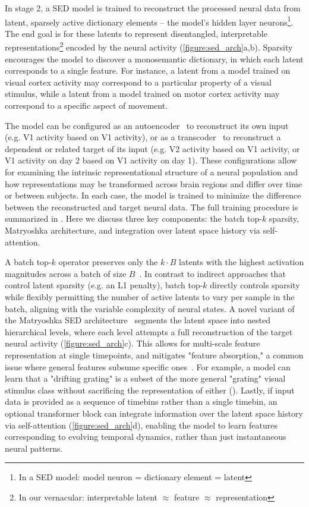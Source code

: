 In stage 2, a SED model is trained to reconstruct the processed neural data from latent, sparsely active dictionary elements -- the model's hidden layer neurons\footnote{In a SED model: model neuron = dictionary element = latent}. The end goal is for these latents to represent disentangled, interpretable representations\footnote{In our vernacular: interpretable latent $\approx$ feature $\approx$ representation} encoded by the neural activity (\autoref{figure:sed_arch}a,b). Sparsity encourages the model to discover a monosemantic dictionary, in which each latent corresponds to a single feature. For instance, a latent from a model trained on visual cortex activity may correspond to a particular property of a visual stimulus, while a latent from a model trained on motor cortex activity may correspond to a specific aspect of movement.

The model can be configured as an autoencoder~\cite{cunningham_2023_saes} to reconstruct its own input (e.g. V1 activity based on V1 activity), or as a transcoder~\cite{ dunefsky_2024_transcoders} to reconstruct a dependent or related target of its input (e.g. V2 activity based on V1 activity, or V1 activity on day 2 based on V1 activity on day 1). These configurations allow for examining the intrinsic representational structure of a neural population and how representations may be transformed across brain regions and differ over time or between subjects. In each case, the model is trained to minimize the difference between the reconstructed and target neural data. The full training procedure is summarized in . Here we discuss three key components: the batch top-$k$ sparsity, Matryoshka architecture, and integration over latent space history via self-attention.

A batch top-$k$ operator preserves only the $k \cdot B$ latents with the highest activation magnitudes across a batch of size $B$~\cite{bussmann_2024_batchtopk}. In contrast to indirect approaches that control latent sparsity (e.g. an L1 penalty), batch top-$k$ directly controls sparsity while flexibly permitting the number of active latents to vary per sample in the batch, aligning with the variable complexity of neural states. A novel variant of the Matryoshka SED architecture~\cite{bussmann_2025_msae} segments the latent space into nested hierarchical levels, where each level attempts a full reconstruction of the target neural activity (\autoref{figure:sed_arch}c). This allows for multi-scale feature representation at single timepoints, and mitigates "feature absorption," a common issue where general features subsume specific ones~\cite{chanin_2024_feature_absorption}. For example, a model can learn that a "drifting grating" is a subset of the more general "grating" visual stimulus class without sacrificing the representation of either (). Lastly, if input data is provided as a sequence of timebins rather than a single timebin, an optional transformer block can integrate information over the latent space history via self-attention (\autoref{figure:sed_arch}d), enabling the model to learn features corresponding to evolving temporal dynamics, rather than just instantaneous neural patterns.

